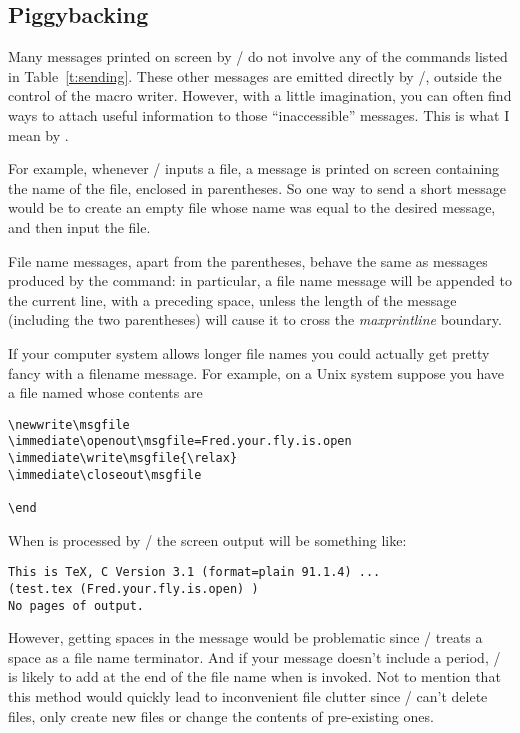 {\subsection{Piggybacking}
Many messages printed on screen by \tex/ do not
involve any of the commands listed in Table~\ref{t:sending}.
These other messages
are emitted directly by \tex/, outside the control of
the macro writer. However, with a little imagination,
you can often find ways to attach useful information
to those ``inaccessible'' messages. This is what I mean
by .

For example, whenever \tex/ inputs a file, a message is printed on
screen containing the name of the file, enclosed in parentheses. So
one way to send a short message would be to create an empty file
whose name was equal to the desired message, and then input the file.

File name messages, apart from the parentheses, behave the same as
messages produced by the  command: in particular, a file name
message will be appended to the current line, with
a preceding space, unless the length of the
message (including the two parentheses) will cause it
to cross the {\it max\underscore print\underscore line} boundary.

If your computer system allows longer file names
you could actually get pretty fancy with a filename message.
For example, on a Unix system suppose you have a file named
 whose contents are
\begin{verbatim}
\newwrite\msgfile
\immediate\openout\msgfile=Fred.your.fly.is.open
\immediate\write\msgfile{\relax}
\immediate\closeout\msgfile

\end
\end{verbatim}
When  is processed by \tex/ the screen output will be
something like:
\begin{verbatim}
This is TeX, C Version 3.1 (format=plain 91.1.4) ...
(test.tex (Fred.your.fly.is.open) )
No pages of output.
\end{verbatim}
However, getting spaces in the message would be problematic since
\tex/ treats a space as a file name terminator. And if your message
doesn't include a period, \tex/ is likely to add  at the end
of the file name when  is invoked. Not to mention that
this method would quickly lead to inconvenient file clutter since
\tex/ can't delete files, only create new files or change the contents
of pre-existing ones.

}
